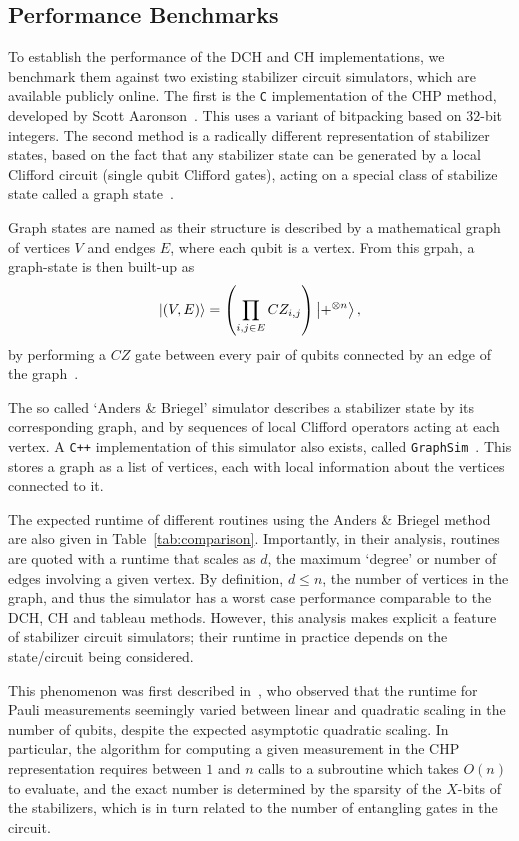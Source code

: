 \subsection{Performance Benchmarks}
To establish the performance of the DCH and CH implementations, we benchmark them against two existing stabilizer circuit simulators, which are available publicly online. The first is the \texttt{C} implementation of the CHP method, developed by Scott Aaronson~\cite{Aaronson2004b}. This uses a variant of bitpacking based on $32$-bit integers. The second method is a radically different representation of stabilizer states, based on the fact that any stabilizer state can be generated by a local Clifford circuit (single qubit Clifford gates), acting on a special class of stabilize state called a graph state~\cite{Schlingemann2001,VandenNest2004}.\par
Graph states are named as their structure is described by a mathematical graph of vertices $V$ and endges $E$, where each qubit is a vertex. From this grpah, a graph-state is then built-up as
\[\ket{(V,E)} = \left(\prod_{i,j \in E}CZ_{i,j}\right)\ket{+^{\otimes n}},\]
by performing a $CZ$ gate between every pair of qubits connected by an edge of the graph~\cite{VandenNest2004}.\par
The so called `Anders \& Briegel' simulator describes a stabilizer state by its corresponding graph, and by sequences of local Clifford operators acting at each vertex. A \texttt{C++} implementation of this simulator also exists, called \texttt{GraphSim}~\cite{Anders2006b}. This stores a graph as a list of vertices, each with local information about the vertices connected to it.\par
The expected runtime of different routines using the Anders \& Briegel method are also given in Table~\ref{tab:comparison}. Importantly, in their analysis, routines are quoted with a runtime that scales as $d$, the maximum `degree' or number of edges involving a given vertex. By definition, $d\leq n$, the number of vertices in the graph, and thus the simulator has a worst case performance comparable to the DCH, CH and tableau methods. However, this analysis makes explicit a feature of stabilizer circuit simulators; their runtime in practice depends on the state/circuit being considered.\par
This phenomenon was first described in~\cite{Aaronson2004}, who observed that the runtime for Pauli measurements seemingly varied between linear and quadratic scaling in the number of qubits, despite the expected asymptotic quadratic scaling. In particular, the algorithm for computing a given measurement in the CHP representation requires between $1$ and $n$ calls to a subroutine which takes $O(n)$ to evaluate, and the exact number is determined by the sparsity of the $X$-bits of the stabilizers, which is in turn related to the number of entangling gates in the circuit.\par
